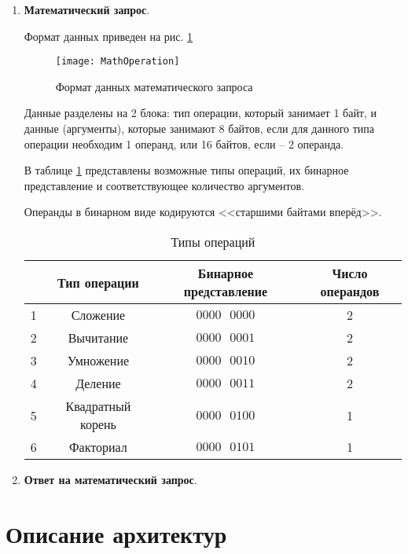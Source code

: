 \begin{enumerate}
	\item \textbf{Математический запрос}.
	
	Формат данных приведен на рис. \ref{fig:math-req}
	
	\begin{figure}[H]
		\centering
		\texttt{[image: MathOperation]}
		\caption{Формат данных математического запроса}
		\label{fig:math-req}
	\end{figure}
	
	Данные разделены на 2 блока: тип операции, который занимает 1 байт, и данные (аргументы), которые занимают 8 байтов, если для данного типа операции необходим 1 операнд, или 16 байтов, если -- 2 операнда.
	
	В таблице \ref{tab:msg-types} представлены возможные типы операций, их бинарное представление и соответствующее количество аргументов.

	Операнды в бинарном виде кодируются <<старшими байтами вперёд>>.

	\begin{table}[H]
	\begin{center}
		\caption{Типы операций}
		\label{tab:msg-types}
		\def\tabcolsep{4pt}
		\begin{tabular}{|c|c|c|c|}
			\hline 
			& Тип операции & Бинарное представление & Число операндов \\ 
			\hline 
			1 & Сложение & $0000\text{ }0000$ & 2\\ 
			\hline 
			2 & Вычитание & $0000\text{ }0001$ & 2\\ 
			\hline 
			3 & Умножение & $0000\text{ }0010$ & 2\\ 
			\hline 
			4 & Деление & $0000\text{ }0011$ & 2\\ 
			\hline
			5 & Квадратный корень & $0000\text{ }0100$ & 1\\ 
			\hline 
			6 & Факториал & $0000\text{ }0101$  & 1\\ 
			\hline 
		\end{tabular} 
	\end{center}
	\end{table}
	
	\item \textbf{Ответ на математический запрос}.
	
	
\end{enumerate}

\section{Описание архитектур}

